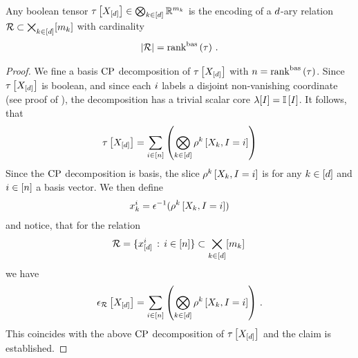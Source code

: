\begin{theorem}
    Any boolean tensor $ \tau\left[X_{[d]}\right]\in\bigotimes_{k\in[d]} \mathbb{R}^{m_{k}}$ is the encoding of a $d$-ary relation $\mathcal{R}\subset\bigtimes_{k\in[d]}[m_{k}]$ with cardinality
    \begin{align*}
        \left|\mathcal{R}\right| = \mathrm{rank}^{\mathrm{bas}}\left(\tau\right) \, .
    \end{align*}
\end{theorem}
\begin{proof}
    We fine a basis $\mathrm{CP}$ decomposition of $\tau\left[X_{[d]}\right]$ with $n=\mathrm{rank}^{\mathrm{bas}}\left(\tau\right)$.
    Since $\tau\left[X_{[d]}\right]$ is boolean, and since each $i$ labels a disjoint non-vanishing coordinate (see proof of ), the decomposition has a trivial scalar core $\lambda[I]=\mathbb{I}\left[I\right]$.
    It follows, that
    \begin{align*}
        \tau\left[X_{[d]}\right] = \sum_{i\in[n]} \left(\bigotimes_{k\in[d]}\rho^{k}\left[X_{k},I=i\right]\right)
    \end{align*}
    Since the $\mathrm{CP}$ decomposition is basis, the slice $\rho^{k}\left[X_{k},I=i\right]$ is for any $k\in[d]$ and $i\in[n]$ a basis vector.
    We then define
    \begin{align*}
        x_{k}^{i} = \epsilon^{-1}(\rho^{k}\left[X_{k},I=i\right])
    \end{align*}
    and notice, that for the relation
    \begin{align*}
        \mathcal{R} = \{ x_{[d]}^{i}  \,:\, i\in[n]\} \subset \bigtimes_{k\in[d]}[m_{k}] \,
    \end{align*}
    we have
    \begin{align*}
        \epsilon_{\mathcal{R}}\left[X_{[d]}\right] = \sum_{i\in[n]} \left(\bigotimes_{k\in[d]}\rho^{k}\left[X_{k},I=i\right]\right) \, .
    \end{align*}
    This coincides with the above $\mathrm{CP}$ decomposition of $\tau\left[X_{[d]}\right]$ and the claim is established.
\end{proof}



